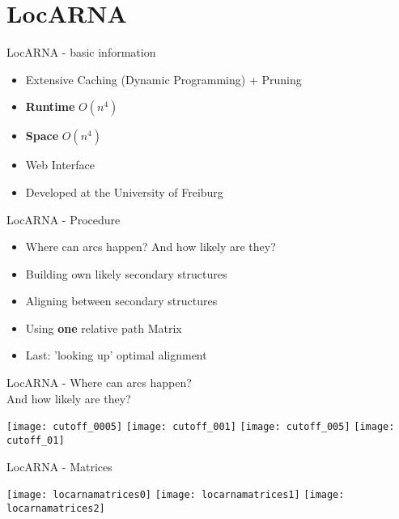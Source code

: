 \section{LocARNA}

\begin{frame}[c]{LocARNA - basic information}
    \begin{itemize}[<+(1)->]
        \item Extensive Caching (Dynamic Programming) + Pruning
        \item {\bf Runtime} $O(n^4)$
        \item {\bf Space} $O(n^4)$
        \item Web Interface
        \item Developed at the University of Freiburg
    \end{itemize}
\end{frame}



\begin{frame}[c]{LocARNA - Procedure}
    \begin{itemize}[<+(1)->]
    \item Where can arcs happen? And how likely are they?
    \item Building own likely secondary structures
    \item Aligning between secondary structures
    \item Using {\bf one} relative path Matrix
    \item Last: 'looking up' optimal alignment
    \end{itemize}
\end{frame}


\begin{frame}[c]{LocARNA - Where can arcs happen? \\ And how likely are they?}
    \begin{overprint}
    \centering\texttt{[image: cutoff\_0005]}
    \centering\texttt{[image: cutoff\_001]}
    \centering\texttt{[image: cutoff\_005]}
    \centering\texttt{[image: cutoff\_01]}
    \end{overprint}
\end{frame}


\begin{frame}[c]{LocARNA - Matrices}
    \begin{overprint}
    \centering\texttt{[image: locarnamatrices0]}
    \centering\texttt{[image: locarnamatrices1]}
    \centering\texttt{[image: locarnamatrices2]}
    \end{overprint}
\end{frame}

